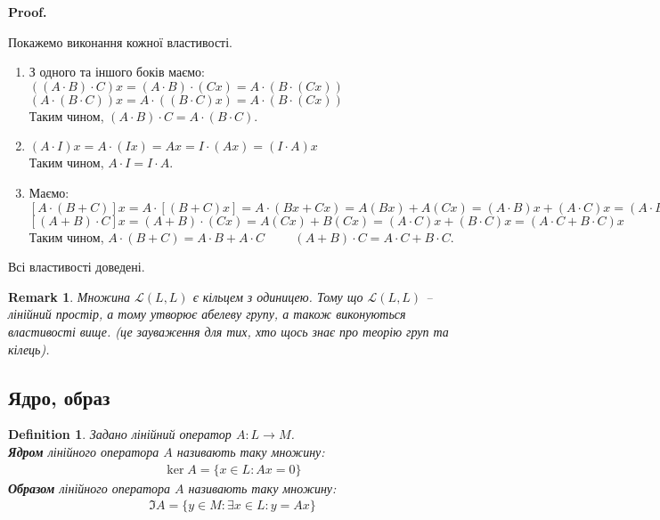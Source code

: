 \documentclass[a4paper, 10pt]{article}
\makeatletter
\theoremstyle{theoremdd}
\newtheorem{definition}[theorem]{Definition}
\newtheorem{remark}[theorem]{Remark}
\renewenvironment{proof}[1][Proof.\\]{\par
\pushQED{\hfill \qed}%
\normalfont \topsep6\p@\@plus6\p@\relax
\trivlist
\item\relax
{\bfseries
#1\@addpunct{.}}\hspace\labelsep\ignorespaces
}{%
\popQED\endtrivlist\@endpefalse
}
\makeatother
\begin{document}
	\begin{proof}
	Покажемо виконання кожної властивості.
	\begin{enumerate}[topsep=-\parskip, wide=0pt, label={\arabic*)}]
	\item З одного та іншого боків маємо:\\
	$((A \cdot B) \cdot C) x = (A \cdot B) \cdot (Cx) = A \cdot (B \cdot (Cx))$\\
	$(A \cdot (B \cdot C)) x = A \cdot ( (B \cdot C) x) = A \cdot (B \cdot (Cx))$\\
	Таким чином, $(A \cdot B) \cdot C = A \cdot (B \cdot C)$.
	\item $(A \cdot I) x = A \cdot (Ix) = A x = I \cdot (A x) = (I \cdot A) x$\\
	Таким чином, $A \cdot I = I \cdot A$.
	\item Маємо: \\
	$[A \cdot (B + C)]x = A \cdot [(B+C)x] = A \cdot (Bx + Cx) = A (Bx) + A (Cx) = (A \cdot B)x + (A \cdot C)x = (A \cdot B + A \cdot C)x$\\
	$[(A+B) \cdot C]x = (A+B) \cdot (Cx) = A (Cx) + B (Cx) = (A \cdot C)x + (B \cdot C)x = (A \cdot C + B \cdot C)x$\\
	Таким чином, $A \cdot (B+C) = A \cdot B + A \cdot C \hspace{1cm} (A+B) \cdot C = A \cdot C + B \cdot C$.
	\end{enumerate}
	Всі властивості доведені.
	\end{proof}
	
	\begin{remark}
	Множина $\mathcal{L}(L,L)$ є кільцем з одиницею. Тому що $\mathcal{L}(L,L)$ -- лінійний простір, а тому утворює абелеву групу, а також виконуються властивості вище. (це зауваження для тих, хто щось знає про теорію груп та кілець).
	\end{remark}
	
	\subsection{Ядро, образ}
	\begin{definition}
	Задано лінійний оператор $A \colon L \to M$.\\
	\textbf{Ядром} лінійного оператора $A$ називають таку множину:
	\begin{align*}
	\ker A = \{x \in L: Ax = 0\}
	\end{align*}
	\textbf{Образом} лінійного оператора $A$ називають таку множину:
	\begin{align*}
	\Im A = \{y \in M: \exists x \in L: y = Ax\}
	\end{align*}
	\end{definition}
	
\end{document}
